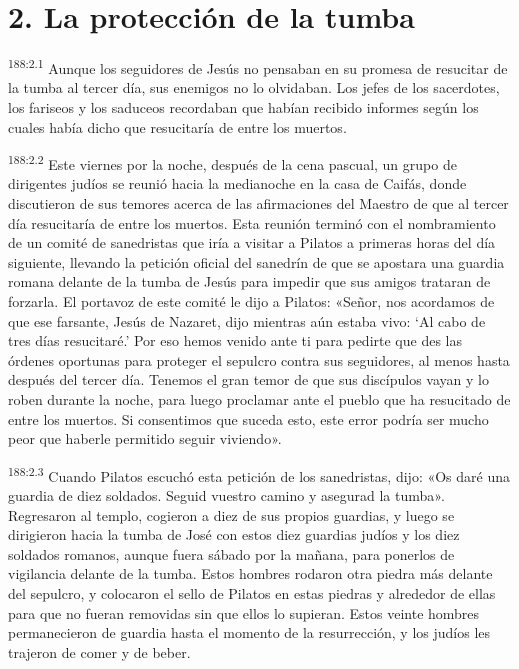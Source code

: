 \section*{2. La protección de la tumba}
\par 
\textsuperscript{188:2.1} Aunque los seguidores de Jesús no pensaban en su promesa de resucitar de la tumba al tercer día, sus enemigos no lo olvidaban. Los jefes de los sacerdotes, los fariseos y los saduceos recordaban que habían recibido informes según los cuales había dicho que resucitaría de entre los muertos.

\par 
\textsuperscript{188:2.2} Este viernes por la noche, después de la cena pascual, un grupo de dirigentes judíos se reunió hacia la medianoche en la casa de Caifás, donde discutieron de sus temores acerca de las afirmaciones del Maestro de que al tercer día resucitaría de entre los muertos. Esta reunión terminó con el nombramiento de un comité de sanedristas que iría a visitar a Pilatos a primeras horas del día siguiente, llevando la petición oficial del sanedrín de que se apostara una guardia romana delante de la tumba de Jesús para impedir que sus amigos trataran de forzarla. El portavoz de este comité le dijo a Pilatos: «Señor, nos acordamos de que ese farsante, Jesús de Nazaret, dijo mientras aún estaba vivo: `Al cabo de tres días resucitaré.' Por eso hemos venido ante ti para pedirte que des las órdenes oportunas para proteger el sepulcro contra sus seguidores, al menos hasta después del tercer día. Tenemos el gran temor de que sus discípulos vayan y lo roben durante la noche, para luego proclamar ante el pueblo que ha resucitado de entre los muertos. Si consentimos que suceda esto, este error podría ser mucho peor que haberle permitido seguir viviendo».

\par 
\textsuperscript{188:2.3} Cuando Pilatos escuchó esta petición de los sanedristas, dijo: «Os daré una guardia de diez soldados. Seguid vuestro camino y asegurad la tumba». Regresaron al templo, cogieron a diez de sus propios guardias, y luego se dirigieron hacia la tumba de José con estos diez guardias judíos y los diez soldados romanos, aunque fuera sábado por la mañana, para ponerlos de vigilancia delante de la tumba. Estos hombres rodaron otra piedra más delante del sepulcro, y colocaron el sello de Pilatos en estas piedras y alrededor de ellas para que no fueran removidas sin que ellos lo supieran. Estos veinte hombres permanecieron de guardia hasta el momento de la resurrección, y los judíos les trajeron de comer y de beber.

